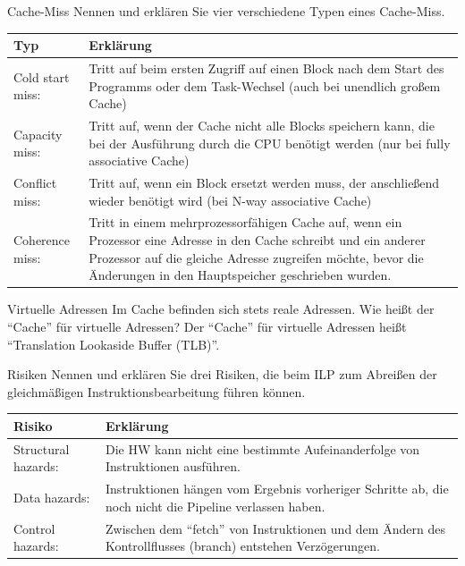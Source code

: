 \begin{aufgabe}[Cache]{Cache-Miss}
    Nennen und erklären Sie vier verschiedene Typen eines Cache-Miss.
    \tcblower
    \begin{tabularx}{\textwidth}{@{}lX@{}}
        \toprule
        Typ              & Erklärung                                                                                                                                          \\
        \midrule
        Cold start miss: & Tritt auf beim ersten Zugriff auf einen Block nach dem Start des Programms oder dem Task-Wechsel (auch bei unendlich großem Cache)                 \\
        Capacity miss:   & Tritt auf, wenn der Cache nicht alle Blocks speichern kann, die bei der Ausführung durch die CPU benötigt werden (nur bei fully associative Cache) \\
        Conflict miss:   & Tritt auf, wenn ein Block ersetzt werden muss, der anschließend wieder benötigt wird (bei N-way associative Cache)                                 \\
        Coherence miss:  & Tritt in einem mehrprozessorfähigen Cache auf,
        wenn ein Prozessor eine Adresse in den Cache schreibt und ein anderer Prozessor auf die gleiche Adresse zugreifen möchte,
        bevor die Änderungen in den Hauptspeicher geschrieben wurden.
    \end{tabularx}
\end{aufgabe}

\begin{aufgabe}[Cache]{Virtuelle Adressen}
    Im Cache befinden sich stets reale Adressen.
    Wie heißt der \enquote{Cache} für virtuelle Adressen?
    \tcblower
    Der \enquote{Cache} für virtuelle Adressen heißt \enquote{Translation Lookaside Buffer (TLB)}.
\end{aufgabe}

\begin{aufgabe}[Parallelität]{Risiken}
    Nennen und erklären Sie drei Risiken,
    die beim ILP zum Abreißen der gleichmäßigen Instruktionsbearbeitung führen können.
    \tcblower
    \begin{tabularx}{\textwidth}{@{}lX@{}}
        \toprule
        Risiko              & Erklärung                                                                                                           \\
        \midrule
        Structural hazards: & Die HW kann nicht eine bestimmte Aufeinanderfolge von Instruktionen ausführen.                                      \\
        Data hazards:       & Instruktionen hängen vom Ergebnis vorheriger Schritte ab,
        die noch nicht die Pipeline verlassen haben.                                                                                              \\
        Control hazards:    & Zwischen dem \enquote{fetch} von Instruktionen und dem Ändern des Kontrollflusses (branch) entstehen Verzögerungen. \\
    \end{tabularx}
\end{aufgabe}

